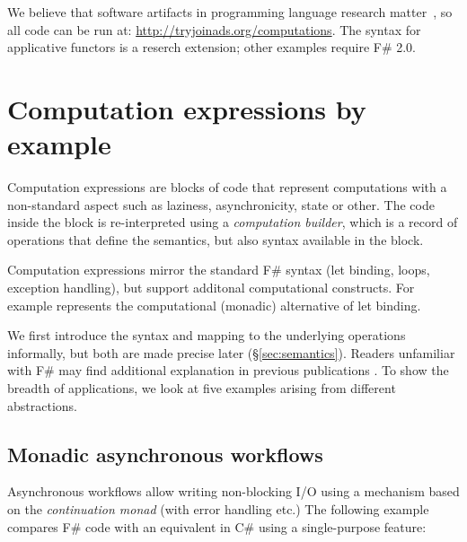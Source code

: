 \documentclass[runningheads,a4paper]{llncs}
\begin{document}
\vspace{1.0em}
\noindent
We believe that software artifacts in programming language research matter~\cite{artifacts}, so all 
code can be run at: \url{http://tryjoinads.org/computations}. 
The syntax for applicative functors is a reserch extension; other examples require F\# 2.0.


\section{Computation expressions by example}
\label{sec:intro}

Computation expressions are blocks of code that represent computations with a non-standard 
aspect such as laziness, asynchronicity, state or other. The code inside the block is re-interpreted 
using a \emph{computation builder}, which is a record of operations that define the semantics,
but also syntax available in the block.

Computation expressions mirror the standard F\# syntax (let binding, loops, exception handling),
but support additonal computational constructs. For example  represents the computational 
(monadic) alternative of let binding.

We first introduce the syntax and mapping to the underlying operations informally, but both are made 
precise later (\S\ref{sec:semantics}). Readers unfamiliar with F\# may find additional explanation
in previous publications \cite{fsharp-spec}. To show the breadth of applications, 
we look at five examples arising from different abstractions.


\subsection{Monadic asynchronous workflows}
\label{sec:intro-async}

Asynchronous workflows \cite{fs-async} allow writing non-blocking I/O using a mechanism based on the 
\emph{continuation monad} (with error handling etc.) The following example compares F\# code
with an equivalent in C\# using a single-purpose feature:
\end{document}
